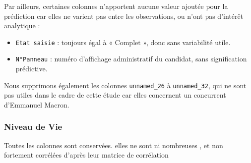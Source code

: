 Par ailleurs, certaines colonnes n’apportent aucune valeur ajoutée pour la prédiction car elles ne varient pas entre les observations, ou n'ont pas d'intérêt analytique :

\begin{itemize}
  \item \texttt{Etat saisie} : toujours égal à « Complet », donc sans variabilité utile.
  \item \texttt{N°Panneau} : numéro d’affichage administratif du candidat, sans signification prédictive.
\end{itemize}

Nous supprimons également les colonnes \texttt{unnamed\_26} à \texttt{unnamed\_32}, qui ne sont pas utiles dans le cadre de cette étude car elles concernent un concurrent d'Emmanuel Macron.



\subsubsection{Niveau de Vie}
Toutes les colonnes sont conservées. elles ne sont ni nombreuses , et non fortement corrélées d'après leur matrice de corrélation

